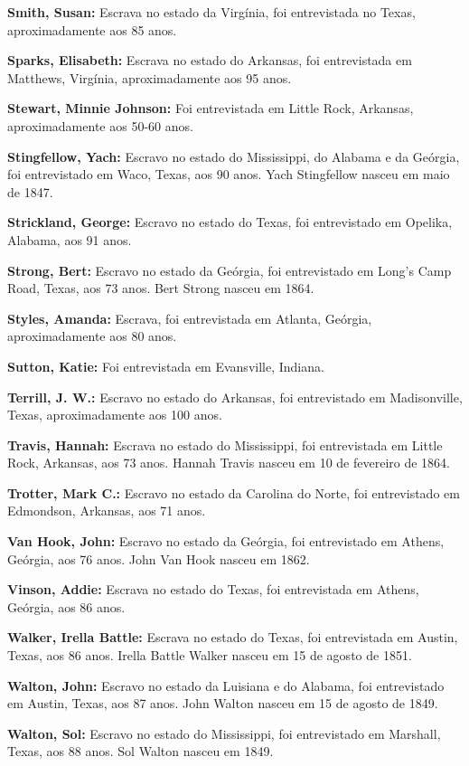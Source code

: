 \textbf{Smith, Susan:} Escrava no estado da Virgínia, foi entrevistada
no Texas, aproximadamente aos 85 anos.

\textbf{Sparks, Elisabeth:} Escrava no estado do Arkansas, foi
entrevistada em Matthews, Virgínia, aproximadamente aos 95 anos.

\textbf{Stewart, Minnie Johnson:} Foi entrevistada em Little Rock,
Arkansas, aproximadamente aos 50-60 anos.

\textbf{Stingfellow, Yach:} Escravo no estado do Mississippi, do Alabama
e da Geórgia, foi entrevistado em Waco, Texas, aos 90 anos. Yach
Stingfellow nasceu em maio de 1847.

\textbf{Strickland, George:} Escravo no estado do Texas, foi
entrevistado em Opelika, Alabama, aos 91 anos.

\textbf{Strong, Bert:} Escravo no estado da Geórgia, foi entrevistado em
Long's Camp Road, Texas, aos 73 anos. Bert Strong nasceu em 1864.

\textbf{Styles, Amanda:} Escrava, foi entrevistada em Atlanta, Geórgia,
aproximadamente aos 80 anos.

\textbf{Sutton, Katie:} Foi entrevistada em Evansville, Indiana.

\textbf{Terrill, J. W.:} Escravo no estado do Arkansas, foi entrevistado
em Madisonville, Texas, aproximadamente aos 100 anos.

\textbf{Travis, Hannah:} Escrava no estado do Mississippi, foi
entrevistada em Little Rock, Arkansas, aos 73 anos. Hannah Travis nasceu
em 10 de fevereiro de 1864.

\textbf{Trotter, Mark C.:} Escravo no estado da Carolina do Norte, foi
entrevistado em Edmondson, Arkansas, aos 71 anos.

\textbf{Van Hook, John:} Escravo no estado da Geórgia, foi entrevistado
em Athens, Geórgia, aos 76 anos. John Van Hook nasceu em 1862.

\textbf{Vinson, Addie:} Escrava no estado do Texas, foi entrevistada em
Athens, Geórgia, aos 86 anos.

\textbf{Walker, Irella Battle:} Escrava no estado do Texas, foi
entrevistada em Austin, Texas, aos 86 anos. Irella Battle Walker nasceu
em 15 de agosto de 1851.

\textbf{Walton, John:} Escravo no estado da Luisiana e do Alabama, foi
entrevistado em Austin, Texas, aos 87 anos. John Walton nasceu em 15 de
agosto de 1849.

\textbf{Walton, Sol:} Escravo no estado do Mississippi, foi entrevistado
em Marshall, Texas, aos 88 anos. Sol Walton nasceu em 1849.

